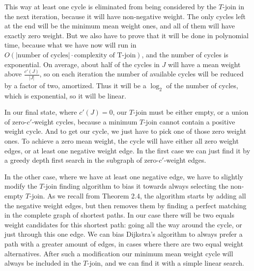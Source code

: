 \documentclass{article}
\begin{document}
  This way at least one cycle is eliminated from being considered by the $T$-join in the next iteration,
  because it will have non-negative weight.
  The only cycles left at the end will be the minimum mean weight ones, and all of them will have exactly zero weight.
  But we also have to prove that it will be done in polynomial time,
  because what we have now will run in $O(|\textrm{number of cycles}| \cdot \textrm{complexity of T-join})$,
  and the number of cycles is exponential.
  On average, about half of the cycles in $J$ will have a mean weight above $\frac{c'(J)}{|J|}$,
  so on each iteration the number of available cycles will be reduced by a factor of two, amortized.
  Thus it will be a $\log_2$ of the number of cycles, which is exponential, so it will be linear.

  In our final state, where $c'(J) = 0$, our $T$-join must be either empty, or a union of zero-$c'$-weight cycles,
  because a minimum $T$-join cannot contain a positive weight cycle.
  And to get our cycle, we just have to pick one of those zero weight ones.
  To achieve a zero mean weight, the cycle will have either all zero weight edges, or at least one negative weight edge.
  In the first case we can just find it by a greedy depth first search in the subgraph of zero-$c'$-weight edges.

  In the other case, where we have at least one negative edge,
  we have to slightly modify the $T$-join finding algorithm to bias it towards always selecting the non-empty $T$-join.
  As we recall from Theorem 2.4, the algorithm starts by adding all the negative weight edges,
  but then removes them by finding a perfect matching in the complete graph of shortest paths.
  In our case there will be two equals weight candidates for this shortest path:
  going all the way around the cycle, or just through this one edge.
  We can bias Dijkstra's algorithm to always prefer a path with a greater amount of edges,
  in cases where there are two equal weight alternatives.
  After such a modification our minimum mean weight cycle will always be included in the $T$-join,
  and we can find it with a simple linear search.
\end{document}
